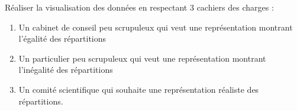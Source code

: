 \documentclass[10pt, a4paper]{article}
\begin{document}
\begin{tcolorbox}[lefttitle=1cm, colframe=gray!75!black, colback=white, title=\textbf{En sortie : A rendre. Quel modèle de gestion des
professeurs pour l’école de demain ?}]
\begin{tcolorbox}[lefttitle=1cm, colframe=gray!75!black, colback=white, title=\textbf{Réalisation d'un rapport}]
Réaliser la visualisation des données en respectant 3 cachiers des charges :
\begin{enumerate}
    \item Un cabinet de conseil peu scrupuleux qui veut une représentation montrant l'égalité des répartitions
    \item Un particulier peu scrupuleux qui veut une représentation montrant l'inégalité des répartitions
    \item Un comité scientifique qui souhaite une représentation réaliste des répartitions.
\end{enumerate}

\end{tcolorbox}

\end{tcolorbox}







\end{document}
